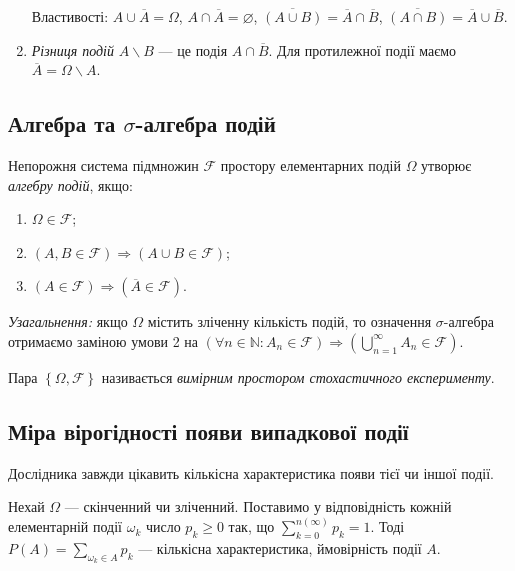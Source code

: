 \begin{enumerate}
    Властивості: $A \cup \overline{A} = \Omega$, $A \cap \overline{A} = \varnothing$, $\overline{\left( A \cup B \right)} = \overline{A} \cap \overline{B}$,
    $\overline{\left( A \cap B \right)} = \overline{A} \cup \overline{B}$.
    \item \emph{Різниця подій} $A \backslash B$ --- це подія $A \cap \overline{B}$. Для протилежної події маємо $\overline{A} =  \Omega \backslash A$.
\end{enumerate}

\subsection{Алгебра та $\sigma$-алгебра подій}
\begin{definition}
    Непорожня система підмножин $\mathcal{F}$ простору елементарних подій $\Omega$ утворює \emph{алгебру подій}, якщо:
    \begin{enumerate}
        \item $\Omega \in \mathcal{F}$;
        \item $\left( A, B \in \mathcal{F}\right) \Rightarrow \left( A \cup B \in \mathcal{F}\right)$;
        \item $\left( A \in \mathcal{F}\right) \Rightarrow \left( \overline{A} \in \mathcal{F}\right)$.
    \end{enumerate}
    \emph{Узагальнення:} якщо $\Omega$ містить зліченну кількість подій, то означення $\sigma$-алгебра отримаємо заміною умови
    2 на $\left(\forall n \in \mathbb{N}: A_n \in \mathcal{F} \right) \Rightarrow \left( \bigcup_{n=1}^{\infty} A_n \in \mathcal{F}\right)$.
    
    Пара $\left\{\Omega, \mathcal{F}\right\}$ називається \emph{вимірним простором стохастичного експерименту}.
\end{definition}

\subsection{Міра вірогідності появи випадкової події}
Дослідника завжди цікавить кількісна характеристика появи тієї чи іншої події.

Нехай $\Omega$ --- скінченний чи зліченний. 
Поставимо у відповідність кожній елементарній події $\omega_k$ число $p_k\geq 0$ так, що $\sum_{k=0}^{ n \left( \infty\right)}p_k = 1$.
Тоді $P(A) = \sum_{\omega_k \in A} p_k$ --- кількісна характеристика, ймовірність події $A$.

